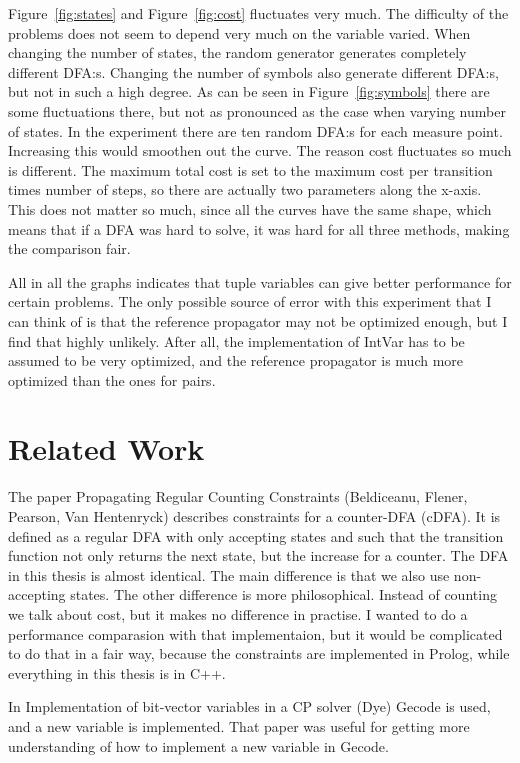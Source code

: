 \documentclass[a4paper,11pt]{article}
\begin{document}
Figure~\ref{fig:states} and Figure~\ref{fig:cost} fluctuates very much. The difficulty of the problems does not seem to depend very much on the variable varied. When changing the number of states, the random generator generates completely different DFA:s. Changing the number of symbols also generate different DFA:s, but not in such a high degree. As can be seen in Figure~\ref{fig:symbols} there are some fluctuations there, but not as pronounced as the case when varying number of states. In the experiment there are ten random DFA:s for each measure point. Increasing this would smoothen out the curve. The reason cost fluctuates so much is different. The maximum total cost is set to the maximum cost per transition times number of steps, so there are actually two parameters along the x-axis. This does not matter so much, since all the curves have the same shape, which means that if a DFA was hard to solve, it was hard for all three methods, making the comparison fair. 

All in all the graphs indicates that tuple variables can give better performance for certain problems. The only possible source of error with this experiment that I can think of is that the reference propagator may not be optimized enough, but I find that highly unlikely. After all, the implementation of IntVar has to be assumed to be very optimized, and the reference propagator is much more optimized than the ones for pairs.

\section{Related Work}
The paper Propagating Regular Counting Constraints (Beldiceanu, Flener, Pearson, Van Hentenryck) describes constraints for a counter-DFA (cDFA). It is defined as a regular DFA with only accepting states and such that the transition function not only returns the next state, but the increase for a counter. The DFA in this thesis is almost identical. The main difference is that we also use non-accepting states. The other difference is more philosophical. Instead of counting we talk about cost, but it makes no difference in practise. I wanted to do a performance comparasion with that implementaion, but it would be complicated to do that in a fair way, because the constraints are implemented in Prolog, while everything in this thesis is in C++.

In Implementation of bit-vector variables in a CP solver (Dye) Gecode is used, and a new variable is implemented. That paper was useful for getting more understanding of how to implement a new variable in Gecode.
\end{document}
